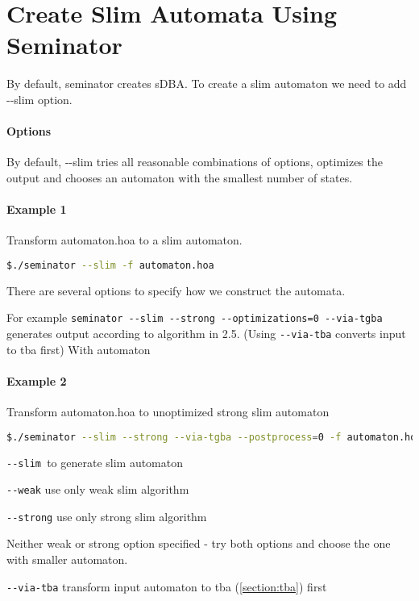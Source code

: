 \documentclass[
	digital,
nolof, nolot
]{fithesis3}
\begin{document}
		\section{Create Slim Automata Using Seminator}
		By default, seminator creates sDBA. To create a slim automaton we need to add -{}-slim option. 
		\paragraph{Options} By default, -{}-slim tries all reasonable combinations of options, optimizes the output and chooses an automaton with the smallest number of states.
		
		\paragraph{Example 1}
		Transform automaton.hoa to a slim automaton.

		\begin{lstlisting}[language=bash]
$./seminator --slim -f automaton.hoa
		\end{lstlisting}
		
		There are several options to specify how we construct the automata.
		
		For example \texttt{seminator -{}-slim -{}-strong -{}-optimizations=0 -{}-via-tgba} generates output according to algorithm in 2.5. (Using \texttt{-{}-via-tba} converts input to tba first) With automaton
		
		
		\paragraph{Example 2}
		Transform automaton.hoa to unoptimized strong slim automaton
		\begin{lstlisting}[language=bash]
$./seminator --slim --strong --via-tgba --postprocess=0 -f automaton.hoa
		\end{lstlisting}
		
		 
		
		\texttt{-{}-slim }to generate slim automaton
		
		\texttt{-{}-weak} use only weak slim algorithm
		
		\texttt{-{}-strong} use only strong slim algorithm
		
		Neither weak or strong option specified - try both options  and choose the one with smaller automaton.
		
		\texttt{-{}-via-tba} transform input automaton to tba (\ref{section:tba}) first
		
\end{document}
